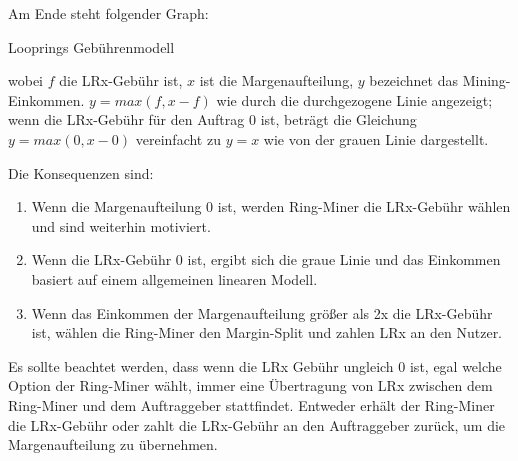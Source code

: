 \documentclass[UTF8,nofonts]{article}
\makeatletter
\newenvironment{figurehere}
 {\def\@captype{figure}}
 {}
\makeatother
\begin{document}
\begin{multicols}{2}
Am Ende steht folgender Graph:

\begin{center}
\begin{figurehere}
\centering
{}
\caption{Looprings Gebührenmodell}
\label{fig:feemodel}
\end{figurehere}
\end{center}


wobei $f$ die LRx-Gebühr ist, $x$ ist die Margenaufteilung, $y$ bezeichnet das Mining-Einkommen. $y=max(f, x-f)$ wie durch die durchgezogene Linie angezeigt; wenn die LRx-Gebühr für den Auftrag $0$ ist, beträgt die Gleichung $y=max(0, x - 0)$ vereinfacht zu $y=x$ wie von der grauen Linie dargestellt.


Die Konsequenzen sind:
\begin{enumerate}
	\item Wenn die Margenaufteilung 0 ist, werden Ring-Miner die LRx-Gebühr wählen und sind weiterhin motiviert.
	\item Wenn die LRx-Gebühr 0 ist, ergibt sich die graue Linie und das Einkommen basiert auf einem allgemeinen linearen Modell.
	\item Wenn das Einkommen der Margenaufteilung größer als 2x die LRx-Gebühr ist, wählen die Ring-Miner den Margin-Split und zahlen LRx an den Nutzer.
\end{enumerate}

Es sollte beachtet werden, dass wenn die LRx Gebühr ungleich 0 ist, egal welche Option der Ring-Miner wählt, immer eine Übertragung von LRx zwischen dem Ring-Miner und dem Auftraggeber stattfindet. Entweder erhält der Ring-Miner die LRx-Gebühr oder zahlt die LRx-Gebühr an den Auftraggeber zurück, um die Margenaufteilung zu übernehmen.


\end{multicols}
\end{document}

